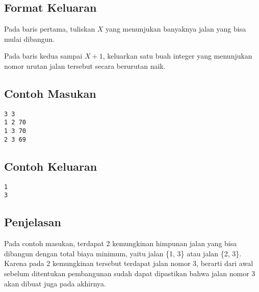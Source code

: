 \documentclass{article}
\begin{document}
\subsection*{Format Keluaran}

Pada baris pertama, tuliskan $X$ yang menunjukan banyaknya jalan yang bisa mulai dibangun.

Pada baris kedua sampai $X + 1$, keluarkan satu buah integer yang menunjukan nomor urutan jalan tersebut secara berurutan naik.
\\

\begin{multicols}{2}
\subsection*{Contoh Masukan}
\begin{lstlisting}
3 3
1 2 70
1 3 70
2 3 69
\end{lstlisting}
\columnbreak
\subsection*{Contoh Keluaran}
\begin{lstlisting}
1
3
\end{lstlisting}
\vfill
\null
\end{multicols}

\subsection*{Penjelasan}
Pada contoh masukan, terdapat 2 kemungkinan himpunan jalan yang bisa dibangun dengan total biaya minimum, yaitu jalan \{1, 3\} atau jalan \{2, 3\}. Karena pada 2 kemungkinan tersebut terdapat jalan nomor 3, berarti dari awal sebelum ditentukan pembangunan sudah dapat dipastikan bahwa jalan nomor 3 akan dibuat juga pada akhirnya.

\pagebreak
\end{document}
